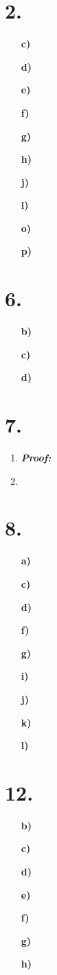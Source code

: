 \documentclass[12pt,letterpaper]{article}
\begin{document}
\section*{2.}
\begin{enumerate}[label= \textbf{\alph*)}]
	\item[\textbf{c)}]
	\item[\textbf{d)}]
	\item[\textbf{e)}]
	\item[\textbf{f)}]
	\item[\textbf{g)}]
	\item[\textbf{h)}]
	\item[\textbf{j)}] 
	\item[\textbf{l)}]  
	\item[\textbf{o)}]
	\item[\textbf{p)}]
\end{enumerate}

\section*{6.}
\begin{enumerate}[label= \textbf{\alph*)}]
	\item[\textbf{b)}]
	\item[\textbf{c)}]
	\item[\textbf{d)}]  
\end{enumerate}

\section*{7.}
\begin{enumerate}[label= \textbf{\alph*)}]
	\item \textbf{\textit{Proof:}}
	\item 
\end{enumerate}

\section*{8.}
\begin{enumerate}[label= \textbf{\alph*)}]
	\item[\textbf{a)}]
	\item[\textbf{c)}]
	\item[\textbf{d)}]
	\item[\textbf{f)}]
	\item[\textbf{g)}]
	\item[\textbf{i)}]
	\item[\textbf{j)}]
	\item[\textbf{k)}]
	\item[\textbf{l)}]        
\end{enumerate}

\section*{12.}
\begin{enumerate}[label= \textbf{\alph*)}]
	\item[\textbf{b)}]
	\item[\textbf{c)}]
	\item[\textbf{d)}]
	\item[\textbf{e)}]
	\item[\textbf{f)}]
	\item[\textbf{g)}]
	\item[\textbf{h)}] 
\end{enumerate}
\end{document}
